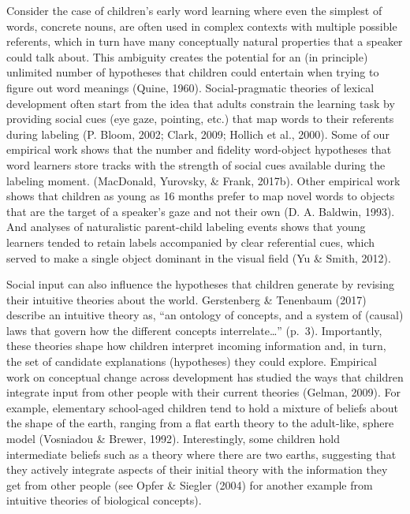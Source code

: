 \documentclass[oneside]{report}
\begin{document}
Consider the case of children's early word learning where even the
simplest of words, concrete nouns, are often used in complex contexts
with multiple possible referents, which in turn have many conceptually
natural properties that a speaker could talk about. This ambiguity
creates the potential for an (in principle) unlimited number of
hypotheses that children could entertain when trying to figure out word
meanings (Quine, 1960). Social-pragmatic theories of lexical development
often start from the idea that adults constrain the learning task by
providing social cues (eye gaze, pointing, etc.) that map words to their
referents during labeling (P. Bloom, 2002; Clark, 2009; Hollich et al.,
2000). Some of our empirical work shows that the number and fidelity
word-object hypotheses that word learners store tracks with the strength
of social cues available during the labeling moment. (MacDonald,
Yurovsky, \& Frank, 2017b). Other empirical work shows that children as
young as 16 months prefer to map novel words to objects that are the
target of a speaker's gaze and not their own (D. A. Baldwin, 1993). And
analyses of naturalistic parent-child labeling events shows that young
learners tended to retain labels accompanied by clear referential cues,
which served to make a single object dominant in the visual field (Yu \&
Smith, 2012).

Social input can also influence the hypotheses that children generate by
revising their intuitive theories about the world. Gerstenberg \&
Tenenbaum (2017) describe an intuitive theory as, ``an ontology of
concepts, and a system of (causal) laws that govern how the different
concepts interrelate\ldots{}'' (p.~3). Importantly, these theories shape
how children interpret incoming information and, in turn, the set of
candidate explanations (hypotheses) they could explore. Empirical work
on conceptual change across development has studied the ways that
children integrate input from other people with their current theories
(Gelman, 2009). For example, elementary school-aged children tend to
hold a mixture of beliefs about the shape of the earth, ranging from a
flat earth theory to the adult-like, sphere model (Vosniadou \& Brewer,
1992). Interestingly, some children hold intermediate beliefs such as a
theory where there are two earths, suggesting that they actively
integrate aspects of their initial theory with the information they get
from other people (see Opfer \& Siegler (2004) for another example from
intuitive theories of biological concepts).
\end{document}
